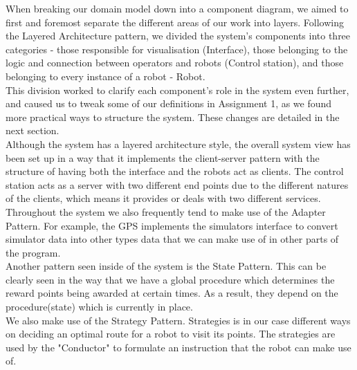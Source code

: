 When breaking our domain model down into a component diagram, we aimed to first and foremost separate the different areas of our work into layers. Following the Layered Architecture pattern, we divided the system's components into three categories - those responsible for visualisation (Interface), those belonging to the logic and connection between operators and robots (Control station), and those belonging to every instance of a robot - Robot.\\


This division worked to clarify each component's role in the system even further, and caused us to tweak some of our definitions in Assignment 1, as we found more practical ways to structure the system. These changes are detailed in the next section.\\


Although the system has a layered architecture style, the overall system view has been set up in a way that it implements the client-server pattern with the structure of having both the interface and the robots act as clients. The control station acts as a server with two different end points due to the different natures of the clients, which means it provides or deals with two different services.\\


Throughout the system we also frequently tend to make use of the Adapter Pattern. For example, the GPS implements the simulators interface to convert simulator data into other types data that we can make use of in other parts of the program.\\


Another pattern seen inside of the system is the State Pattern. This can be clearly seen in the way that we have a global procedure which determines the reward points being awarded at certain times. As a result, they depend on the procedure(state) which is currently in place. \\


We also make use of the Strategy Pattern. Strategies is in our case different ways on deciding an optimal route for a robot to visit its points. The strategies are used by the "Conductor" to formulate an instruction that the robot can make use of.









